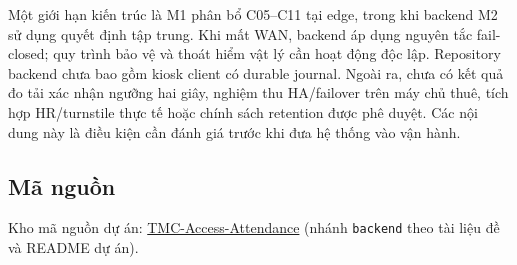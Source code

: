 Một giới hạn kiến trúc là M1 phân bổ C05--C11 tại edge, trong khi backend M2 sử dụng quyết định tập trung. Khi mất WAN, backend áp dụng nguyên tắc fail-closed; quy trình bảo vệ và thoát hiểm vật lý cần hoạt động độc lập. Repository backend chưa bao gồm kiosk client có durable journal. Ngoài ra, chưa có kết quả đo tải xác nhận ngưỡng hai giây, nghiệm thu HA/failover trên máy chủ thuê, tích hợp HR/turnstile thực tế hoặc chính sách retention được phê duyệt. Các nội dung này là điều kiện cần đánh giá trước khi đưa hệ thống vào vận hành.

\subsection{Mã nguồn}
\label{subsec:source-url}
Kho mã nguồn dự án: \href{https://github.com/khieudangbk/TMC-Access-Attendance}{TMC-Access-Attendance} (nhánh \texttt{backend} theo tài liệu đề và README dự án).

